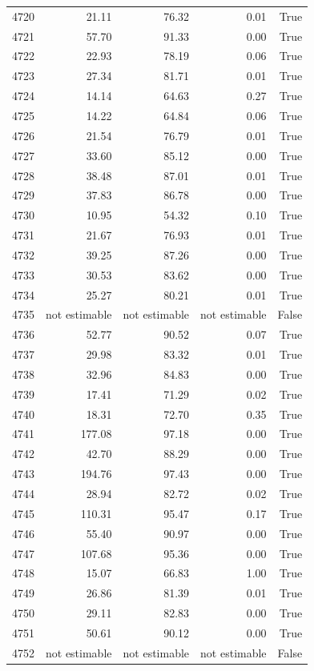 \begin{longtable}{rrrrr}
4720 & 21.11 & 76.32 & 0.01 & True \\
4721 & 57.70 & 91.33 & 0.00 & True \\
4722 & 22.93 & 78.19 & 0.06 & True \\
4723 & 27.34 & 81.71 & 0.01 & True \\
4724 & 14.14 & 64.63 & 0.27 & True \\
4725 & 14.22 & 64.84 & 0.06 & True \\
4726 & 21.54 & 76.79 & 0.01 & True \\
4727 & 33.60 & 85.12 & 0.00 & True \\
4728 & 38.48 & 87.01 & 0.01 & True \\
4729 & 37.83 & 86.78 & 0.00 & True \\
4730 & 10.95 & 54.32 & 0.10 & True \\
4731 & 21.67 & 76.93 & 0.01 & True \\
4732 & 39.25 & 87.26 & 0.00 & True \\
4733 & 30.53 & 83.62 & 0.00 & True \\
4734 & 25.27 & 80.21 & 0.01 & True \\
4735 & not estimable & not estimable & not estimable & False \\
4736 & 52.77 & 90.52 & 0.07 & True \\
4737 & 29.98 & 83.32 & 0.01 & True \\
4738 & 32.96 & 84.83 & 0.00 & True \\
4739 & 17.41 & 71.29 & 0.02 & True \\
4740 & 18.31 & 72.70 & 0.35 & True \\
4741 & 177.08 & 97.18 & 0.00 & True \\
4742 & 42.70 & 88.29 & 0.00 & True \\
4743 & 194.76 & 97.43 & 0.00 & True \\
4744 & 28.94 & 82.72 & 0.02 & True \\
4745 & 110.31 & 95.47 & 0.17 & True \\
4746 & 55.40 & 90.97 & 0.00 & True \\
4747 & 107.68 & 95.36 & 0.00 & True \\
4748 & 15.07 & 66.83 & 1.00 & True \\
4749 & 26.86 & 81.39 & 0.01 & True \\
4750 & 29.11 & 82.83 & 0.00 & True \\
4751 & 50.61 & 90.12 & 0.00 & True \\
4752 & not estimable & not estimable & not estimable & False \\

\end{longtable}
